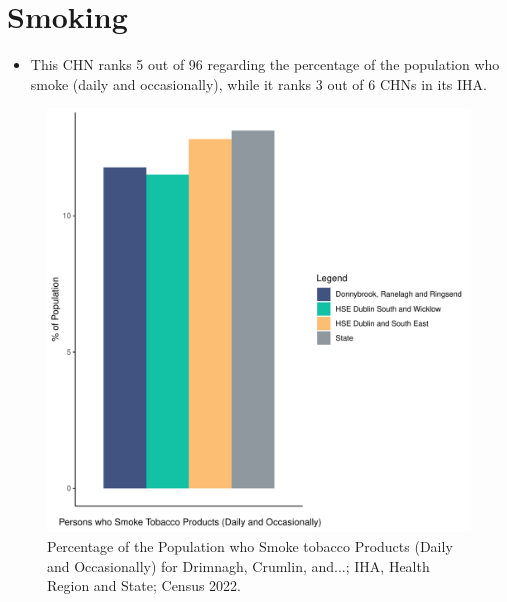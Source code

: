 \documentclass{article}
\begin{document}
\pagebreak

\section{Smoking}\label{sect:Smoking}
\begin{itemize}
\item This CHN ranks  5 out of 96 regarding the percentage of the population who smoke (daily and occasionally), while it ranks   3 out of 6 CHNs in its IHA.
\end{itemize}
\begin{figure}[H]
	\centering
	\includegraphics[width = 120mm]{../figures/SmokingED.pdf}
	\caption{Percentage of the Population who Smoke tobacco Products (Daily and Occasionally) for Drimnagh, Crumlin, and...; IHA, Health Region and State; Census 2022.}
	\label{fig:2ae19629-1a6a-13a3-e055-000000000001}
	\end{figure}
	
\end{document}
